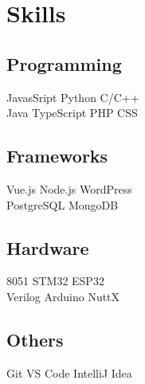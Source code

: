 \documentclass[]{deedy-resume-openfont}
\begin{document}
\begin{minipage}[t]{0.33\textwidth}

\section{Skills}

\subsection{Programming}
JavasSript \textbullet{} Python \textbullet{} C/C++ \\
Java \textbullet{} TypeScript \textbullet{} PHP \textbullet{} CSS \\
\sectionsep

\subsection{Frameworks}
Vue.js \textbullet{} Node.js \textbullet{} WordPress \\
PostgreSQL \textbullet{} MongoDB \\
\sectionsep

\subsection{Hardware}
8051 \textbullet{} STM32 \textbullet{} ESP32 \\
Verilog \textbullet{} Arduino \textbullet{} NuttX \\
\sectionsep

\subsection{Others}
Git \textbullet{} VS Code \textbullet{} IntelliJ Idea \\
\sectionsep

%
%

\end{minipage}
\hfill
\end{document}
